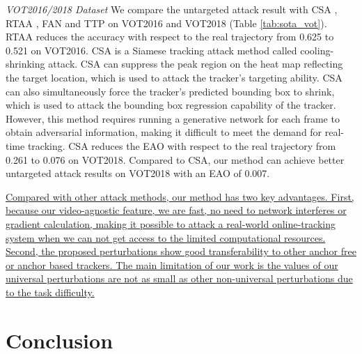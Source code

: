 \documentclass[journal]{IEEEtran}
\begin{document}
\textit{VOT2016/2018 Dataset} We compare the untargeted attack result with CSA \cite{CSA}, RTAA \cite{RTAA}, FAN \cite{FAN} and TTP \cite{TTP} on VOT2016 and VOT2018 (Table \ref{tab:sota_vot}). 
RTAA reduces the accuracy with respect to the real trajectory from 0.625 to 0.521 on VOT2016.
CSA \cite{CSA} is a Siamese tracking attack method called cooling-shrinking attack. CSA can suppress the peak region on the heat map reflecting the target location, which is used to attack the tracker's targeting ability. CSA can also simultaneously force the tracker's predicted bounding box to shrink, which is used to attack the bounding box regression capability of the tracker. However, this method requires running a generative network for each frame to obtain adversarial information, making it difficult to meet the demand for real-time tracking. CSA reduces the EAO with respect to the real trajectory from 0.261 to 0.076 on VOT2018. Compared to CSA, our method can achieve better untargeted attack results on VOT2018 with an EAO of 0.007.

\uline{Compared with other attack methods, our method has two key advantages. First, because our video-agnostic feature, we are fast, no need to network interferes or gradient calculation, making it possible to attack a real-world online-tracking system when we can not get access to the limited computational resources. Second, the proposed perturbations show good transferability to other anchor free or anchor based trackers. The main limitation of our work is the values of our universal perturbations are not as small as other non-universal perturbations due to the task difficulty.}

\section{Conclusion}
\end{document}
